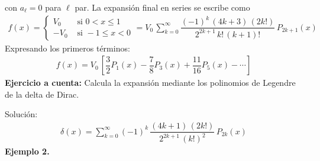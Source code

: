 con $a_{\ell} = 0$ para $\ell$ par. La expansión final en series se escribe como
\begin{align*}
f(x) = \begin{cases}
V_{0} & \text{ si } 0 < x \leq 1 \\
-V_{0} & \text{ si } -1 \leq x < 0
\end{cases}
= V_{0} \, \sum_{k=0}^{\infty} \dfrac{(-1)^{k} \,(4k+3) \, (2k!)}{2^{2k+1} \, k! \, (k+1)!} \, P_{2k+1} (x)
\end{align*}
Expresando los primeros términos:
\begin{align*}
f(x) = V_{0} \, \left[ \dfrac{3}{2} P_{1}(x) - \dfrac{7}{8} P_{3}(x) + \dfrac{11}{16} P_{5}(x) - \cdots \right]
\end{align*}
\textbf{Ejercicio a cuenta: } Calcula la expansión mediante los polinomios de Legendre de la delta de Dirac.
\par
Solución:
\begin{align*}
\delta(x) = \sum_{k=0}^{\infty} (-1)^{k} \, \dfrac{(4k + 1) \, (2k!)}{2^{2k+1} \, (k!)^{2}} \, P_{2k} (x)
\end{align*}
\textbf{Ejemplo 2.}

